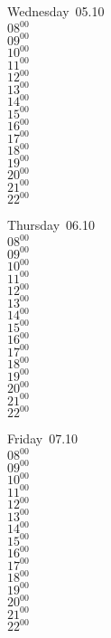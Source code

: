 \documentclass[11pt,a4paper]{book}\usepackage[]{graphicx}\usepackage[]{color}
\begin{document}
\begin{weekdaybox}
  Wednesday~05.10\\
  { 
  \vfill
  $08^{00}$\\
$09^{00}$\\
$10^{00}$\\
$11^{00}$\\
$12^{00}$\\
$13^{00}$\\
$14^{00}$\\
$15^{00}$\\
$16^{00}$\\
$17^{00}$\\
$18^{00}$\\
$19^{00}$\\
$20^{00}$\\
$21^{00}$\\
$22^{00}$\\
  }
\end{weekdaybox}
\clearpage
\begin{headerbox}
\end{headerbox}
\begin{weekdaybox}
  Thursday~06.10\\
  { 
  \vfill
  $08^{00}$\\
$09^{00}$\\
$10^{00}$\\
$11^{00}$\\
$12^{00}$\\
$13^{00}$\\
$14^{00}$\\
$15^{00}$\\
$16^{00}$\\
$17^{00}$\\
$18^{00}$\\
$19^{00}$\\
$20^{00}$\\
$21^{00}$\\
$22^{00}$\\
  }
\end{weekdaybox} 
\begin{weekdaybox}
  Friday~07.10\\
  { 
  \vfill
  $08^{00}$\\
$09^{00}$\\
$10^{00}$\\
$11^{00}$\\
$12^{00}$\\
$13^{00}$\\
$14^{00}$\\
$15^{00}$\\
$16^{00}$\\
$17^{00}$\\
$18^{00}$\\
$19^{00}$\\
$20^{00}$\\
$21^{00}$\\
$22^{00}$\\
  }
\end{weekdaybox}
\end{document}
